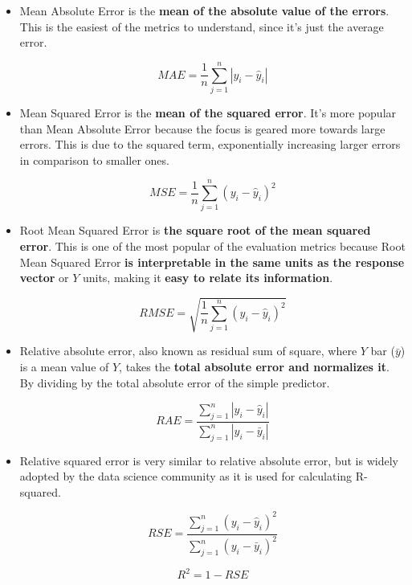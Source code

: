 \begin{itemize}
	
	\item Mean Absolute Error is the \textbf{mean of the absolute value of the errors}. This is the easiest of the metrics to understand, since it's just the average error. 
	
	\begin{equation} \label{MAE}
		MAE = \frac{1}{n} \sum_{j=1}^{n} |y_{i} - \hat{y}_{i}|
	\end{equation}
	
	\item Mean Squared Error is the \textbf{mean of the squared error}. It's more popular than Mean Absolute Error because the focus is geared more towards large errors. This is due to the squared term, exponentially increasing larger errors in comparison to smaller ones. 
	
	\begin{equation} \label{MSE}
		MSE = \frac{1}{n} \sum_{j=1}^{n} (y_{i} - \hat{y}_{i})^{2}
	\end{equation}
	
	\item Root Mean Squared Error is \textbf{the square root of the mean squared error}. This is one of the most popular of the evaluation metrics because Root Mean Squared Error \textbf{is interpretable in the same units as the response vector} or $Y$ units, making it \textbf{easy to relate its information}. 
	
	\begin{equation} \label{RMSE}
		RMSE = \sqrt{\frac{1}{n} \sum_{j=1}^{n} (y_{i} - \hat{y}_{i})^{2}}
	\end{equation}	
	
	\item Relative absolute error, also known as residual sum of square, where $Y$ bar ($\bar{y}$) is a mean value of $Y$, takes the \textbf{total absolute error and normalizes it}. By dividing by the total absolute error of the simple predictor. 
	
	\begin{equation} \label{RAE}
		RAE = \frac{\sum_{j=1}^{n}|y_{i} - \hat{y}_{i}|}{\sum_{j=1}^{n}|y_{i} - \bar{y}_{i}|}
	\end{equation}	
	
	\item Relative squared error is very similar to relative absolute error, but is widely adopted by the data science community as it is used for calculating R-squared. 
	
	\begin{equation} \label{RSE}
		RSE = \frac{\sum_{j=1}^{n}(y_{i} - \hat{y}_{i})^{2}}{\sum_{j=1}^{n}(y_{i} - \bar{y}_{i})^{2}}
	\end{equation}	

	\begin{equation} \label{R}
		R^{2} = 1 - RSE
	\end{equation}
	
\end{itemize}

